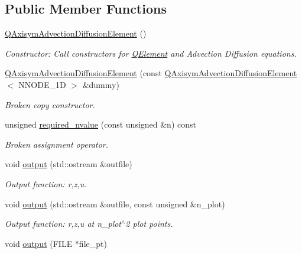 \subsection*{Public Member Functions}
\begin{DoxyCompactItemize}
\item 
\hyperlink{classoomph_1_1QAxisymAdvectionDiffusionElement_a183735ff0dce27e2bc0343f8cb3bbea0}{Q\+Axisym\+Advection\+Diffusion\+Element} ()
\begin{DoxyCompactList}\small\item\em Constructor\+: Call constructors for \hyperlink{classoomph_1_1QElement}{Q\+Element} and Advection Diffusion equations. \end{DoxyCompactList}\item 
\hyperlink{classoomph_1_1QAxisymAdvectionDiffusionElement_ae4e969a1020ebfd6922029a63a14a08e}{Q\+Axisym\+Advection\+Diffusion\+Element} (const \hyperlink{classoomph_1_1QAxisymAdvectionDiffusionElement}{Q\+Axisym\+Advection\+Diffusion\+Element}$<$ N\+N\+O\+D\+E\+\_\+1D $>$ \&dummy)
\begin{DoxyCompactList}\small\item\em Broken copy constructor. \end{DoxyCompactList}\item 
unsigned \hyperlink{classoomph_1_1QAxisymAdvectionDiffusionElement_ae0c6b6099761b998688e2c22f2280a21}{required\+\_\+nvalue} (const unsigned \&n) const
\begin{DoxyCompactList}\small\item\em Broken assignment operator. \end{DoxyCompactList}\item 
void \hyperlink{classoomph_1_1QAxisymAdvectionDiffusionElement_a398cd25b07bc4709163369e2db6e8202}{output} (std\+::ostream \&outfile)
\begin{DoxyCompactList}\small\item\em Output function\+: r,z,u. \end{DoxyCompactList}\item 
void \hyperlink{classoomph_1_1QAxisymAdvectionDiffusionElement_a20cbe0ae52a064c6c5f6a065596beea5}{output} (std\+::ostream \&outfile, const unsigned \&n\+\_\+plot)
\begin{DoxyCompactList}\small\item\em Output function\+: r,z,u at n\+\_\+plot$^\wedge$2 plot points. \end{DoxyCompactList}\item 
void \hyperlink{classoomph_1_1QAxisymAdvectionDiffusionElement_ac095435d0ae6a5f3d74fa474d93906f8}{output} (F\+I\+LE $\ast$file\+\_\+pt)

\end{DoxyCompactItemize}
